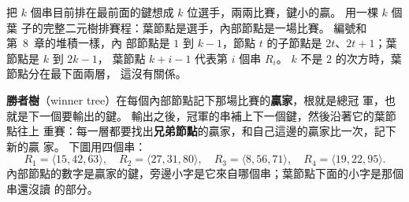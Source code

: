 把 $k$ 個串目前排在最前面的鍵想成 $k$ 位選手，兩兩比賽，鍵小的贏。 用一棵 $k$ 個葉
子的完整二元樹排賽程：葉節點是選手，內部節點是一場比賽。 編號和第~8~章的堆積一樣，內
部節點是 $1$ 到 $k - 1$，節點 $t$ 的子節點是 $2t$、$2t + 1$；葉節點是 $k$ 到 $2k - 1$，
葉節點 $k + i - 1$ 代表第 $i$ 個串 $R_i$。 $k$ 不是 $2$ 的次方時，葉節點分在最下面兩層，
這沒有關係。

\textbf{勝者樹}（winner tree）在每個內部節點記下那場比賽的\textbf{贏家}，根就是總冠
軍，也就是下一個要輸出的鍵。 輸出之後，冠軍的串補上下一個鍵，然後沿著它的葉節點往上
重賽：每一層都要找出\textbf{兄弟節點}的贏家，和自己這邊的贏家比一次，記下新的贏
家。 下圖用四個串：
\[
R_1 = \langle 15, 42, 63 \rangle,\quad
R_2 = \langle 27, 31, 80 \rangle,\quad
R_3 = \langle 8, 56, 71 \rangle,\quad
R_4 = \langle 19, 22, 95 \rangle.
\]
內部節點的數字是贏家的鍵，旁邊小字是它來自哪個串；葉節點下面的小字是那個串還沒讀
的部分。

